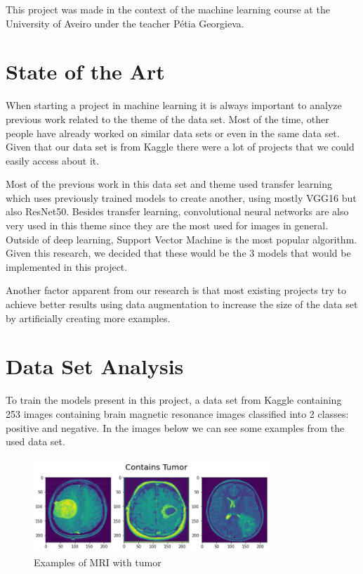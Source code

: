 \documentclass[conference]{IEEEtran}
\begin{document}
This project was made in the context of the machine learning course at the University of Aveiro under the teacher Pétia Georgieva. 


\section{State of the Art\cite{b4}\cite{b5}\cite{b8}}

When starting a project in machine learning it is always important to analyze previous work related to the theme of the data set. Most of the time, other people have already worked on similar data sets or even in the same data set. Given that our data set is from Kaggle there were a lot of projects that we could easily access about it.

Most of the previous work in this data set and theme used transfer learning which uses previously trained models to create another, using mostly VGG16 but also ResNet50. Besides transfer learning, convolutional neural networks are also very used in this theme since they are the most used for images in general. Outside of deep learning, Support Vector Machine is the most popular algorithm. Given this research, we decided that these would be the 3 models that would be implemented in this project.

Another factor apparent from our research is that most existing projects try to achieve better results using data augmentation to increase the size of the data set by artificially creating more examples.

\section{Data Set Analysis}
To train the models present in this project, a data set from Kaggle containing 253 images containing brain magnetic resonance images classified into 2 classes: positive and negative. In the images below we can see some examples from the used data set.

\begin{figure}[H]
    \centering
    \includegraphics[width=3.5in]{has_tumor.PNG}
    \caption{Examples of MRI with tumor}\label{fig:fig1}
\end{figure}
\end{document}
